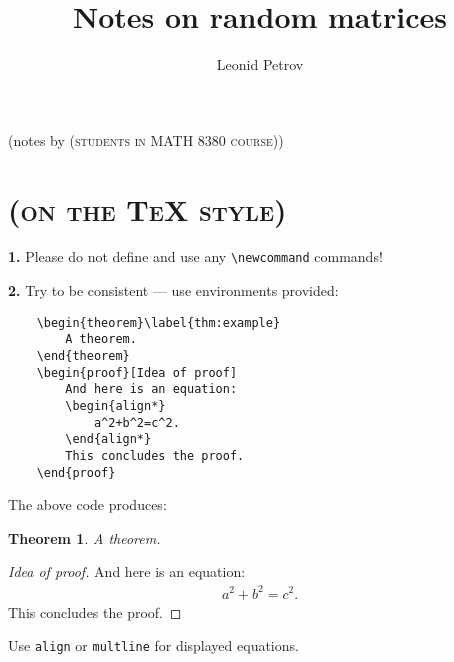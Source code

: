 \documentclass[letterpaper,11pt,oneside,reqno]{amsart}
\numberwithin{equation}{section}
\newcommand{\note}[1]{\textsc{\color{blue}(#1)}}
\newtheorem{theorem}[proposition]{Theorem}
\theoremstyle{definition}
\begin{document}
\title[Notes on random matrices]{Notes on random matrices}

\author[L. Petrov]{Leonid Petrov}
\address{L. Petrov, Department of Mathematics, University of Virginia, 
141 Cabell Drive, Kerchof Hall,
P.O. Box 400137,
Charlottesville, VA 22904, USA,
\newline{}and Institute for Information Transmission Problems, Bolshoy Karetny per. 19, Moscow, 127994, Russia}
\date{}
\maketitle

\begin{center}
	(notes by \note{students in MATH 8380 course})
\end{center}

\tableofcontents
\setcounter{tocdepth}{3}

\section*{\note{on the \TeX{} style}}

\lstset{basicstyle=\footnotesize\ttfamily,language=TeX} 

\textbf{1.} Please do not define and use any \lstinline{\newcommand} commands!

\textbf{2.} Try to be consistent --- use environments provided:
\begin{lstlisting}
	\begin{theorem}\label{thm:example}
		A theorem.		
	\end{theorem}
	\begin{proof}[Idea of proof]
		And here is an equation:
		\begin{align*}
			a^2+b^2=c^2.
		\end{align*}
		This concludes the proof.
	\end{proof}	
\end{lstlisting}
The above code produces:
\begin{theorem}\label{thm:example}
	A theorem.		
\end{theorem}
\begin{proof}[Idea of proof]
	And here is an equation:
	\begin{align*}
		a^2+b^2=c^2.
	\end{align*}
	This concludes the proof.
\end{proof}
Use \lstinline{align} or \lstinline{multline} for displayed equations.
\end{document}
